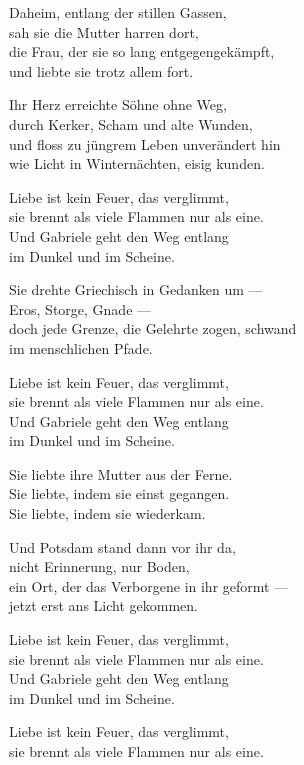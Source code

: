 \begin{lyrics}

Daheim, entlang der stillen Gassen,\\
sah sie die Mutter harren dort,\\
die Frau, der sie so lang entgegengekämpft,\\
und liebte sie trotz allem fort.

Ihr Herz erreichte Söhne ohne Weg,\\
durch Kerker, Scham und alte Wunden,\\
und floss zu jüngrem Leben unverändert hin\\
wie Licht in Winternächten, eisig kunden.

Liebe ist kein Feuer, das verglimmt,\\
sie brennt als viele Flammen nur als eine.\\
Und Gabriele geht den Weg entlang\\
im Dunkel und im Scheine.

Sie drehte Griechisch in Gedanken um —\\
Eros, Storge, Gnade —\\
doch jede Grenze, die Gelehrte zogen, schwand\\
im menschlichen Pfade.

Liebe ist kein Feuer, das verglimmt,\\
sie brennt als viele Flammen nur als eine.\\
Und Gabriele geht den Weg entlang\\
im Dunkel und im Scheine.

Sie liebte ihre Mutter aus der Ferne.\\
Sie liebte, indem sie einst gegangen.\\
Sie liebte, indem sie wiederkam.

Und Potsdam stand dann vor ihr da,\\
nicht Erinnerung, nur Boden,\\
ein Ort, der das Verborgene in ihr geformt —\\
jetzt erst ans Licht gekommen.

Liebe ist kein Feuer, das verglimmt,\\
sie brennt als viele Flammen nur als eine.\\
Und Gabriele geht den Weg entlang\\
im Dunkel und im Scheine.


Liebe ist kein Feuer, das verglimmt,\\
sie brennt als viele Flammen nur als eine.


\end{lyrics}

